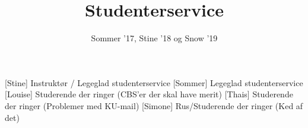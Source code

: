\documentclass[a4paper,11pt]{article}
\title{Studenterservice}
\author{Sommer '17, Stine '18 og Snow '19}
\begin{document}
\maketitle

\begin{roles}
[Stine] Instruktør / Legeglad studenterservice
[Sommer] Legeglad studenterservice
[Louise] Studerende der ringer (CBS'er der skal have merit)
[Thais] Studerende der ringer (Problemer med KU-mail)
[Simone] Rus/Studerende der ringer (Ked af det)
\end{roles}

\begin{props}

\end{props}
\end{document}
